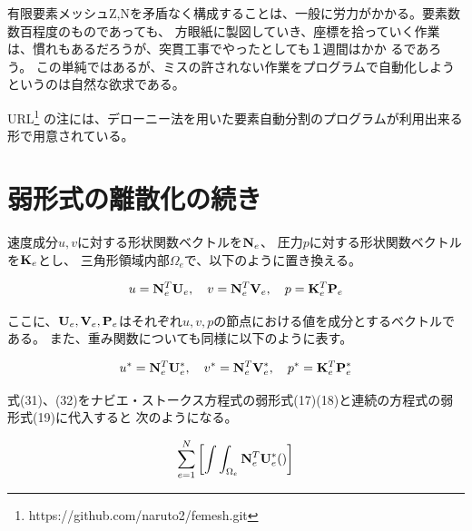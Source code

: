 \documentclass{jarticle}
\begin{document}
有限要素メッシュZ,Nを矛盾なく構成することは、一般に労力がかかる。要素数数百程度のものであっても、
方眼紙に製図していき、座標を拾っていく作業は、慣れもあるだろうが、突貫工事でやったとしても１週間はかか
るであろう。
この単純ではあるが、ミスの許されない作業をプログラムで自動化しようというのは自然な欲求である。

URL\footnote{https://github.com/naruto2/femesh.git}
の注には、デローニー法を用いた要素自動分割のプログラムが利用出来る形で用意されている。


\section{弱形式の離散化の続き}

速度成分$u,v$に対する形状関数ベクトルを${\bf N}_e$、
圧力$p$に対する形状関数ベクトルを${\bf K}_e$とし、
三角形領域内部$\Omega_e$で、以下のように置き換える。

\begin{equation}
u = {\bf N}_e^T{\bf U}_e, ~~~ v = {\bf N}_e^T{\bf V}_e, ~~~ p = {\bf K}_e^T{\bf P}_e
\end{equation}


ここに、${\bf U}_e,{\bf V}_e,{\bf P}_e$はそれぞれ$u,v,p$の節点における値を成分とするベクトルである。
また、重み関数についても同様に以下のように表す。

\begin{equation}
u^* = {\bf N}_e^T{\bf U}_e^*, ~~~ v^* = {\bf N}_e^T{\bf V}_e^*, ~~~ p^* = {\bf K}_e^T{\bf P}_e^*
\end{equation}



式(31)、(32)をナビエ・ストークス方程式の弱形式(17)(18)と連続の方程式の弱形式(19)に代入すると
次のようになる。

\[
\sum_{e=1}^N\left[ \int\int_{\Omega_e}{\bf N}_e^T{\bf U}_e^*() \right]
\]
\end{document}
